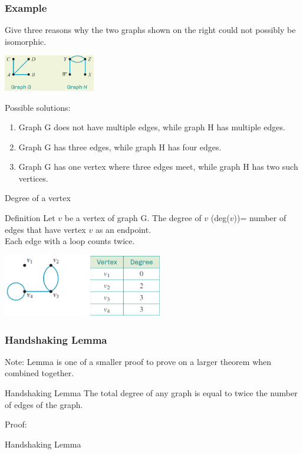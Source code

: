 \documentclass[
	11pt, %
]{beamer}
\begin{document}
\begin{frame}[t]
    \frametitle{Example}
    Give three reasons why the two graphs shown on the right could not possibly be isomorphic.\\
    \begin{center}
        \includegraphics[width = 4cm]{Graph6.png}
    \end{center}
    \begin{block}{Possible solutions:}
        \begin{enumerate}
            \item Graph G does not have multiple edges, while graph H has multiple edges.
            \item Graph G has three edges, while graph H has four edges.
            \item Graph G has one vertex where three edges meet, while graph H has two such vertices.
        \end{enumerate}
    \end{block}
\end{frame}

\begin{frame}{Degree of a vertex}
    \begin{block}{Definition}
        Let $v$ be a vertex of graph G. The degree of $v$ (deg($v$))= number of edges that have vertex $v$ as an endpoint.\\
        Each edge with a loop counts twice.
    \end{block}
    \begin{center}
        \includegraphics[width = 7cm]{Graph7.png}
    \end{center}
\end{frame}

\begin{frame}[t]
    \frametitle{Handshaking Lemma}
    Note: Lemma is one of a smaller proof to prove on a larger theorem when combined together.\\
    \begin{block}{Handshaking Lemma}
        The total degree of any graph is equal to twice the number of edges of the graph.
    \end{block}
    Proof:\\
    
\end{frame}
\begin{frame}{Handshaking Lemma}
\end{frame}
\end{document}
